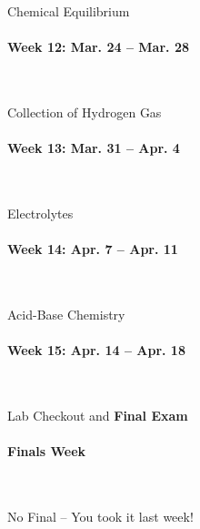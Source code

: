 \documentclass[12pt, letterpaper]{article}
\begin{document}
Chemical Equilibrium

\paragraph{Week 12: Mar. 24 -- Mar. 28}~

Collection of Hydrogen Gas

\paragraph{Week 13: Mar. 31 -- Apr. 4}~

Electrolytes

\paragraph{Week 14: Apr. 7 -- Apr. 11}~

Acid-Base Chemistry

\paragraph{Week 15: Apr. 14 -- Apr. 18}~

Lab Checkout and \textbf{Final Exam}

\paragraph{Finals Week}~

No Final -- You took it last week!
\end{document}
